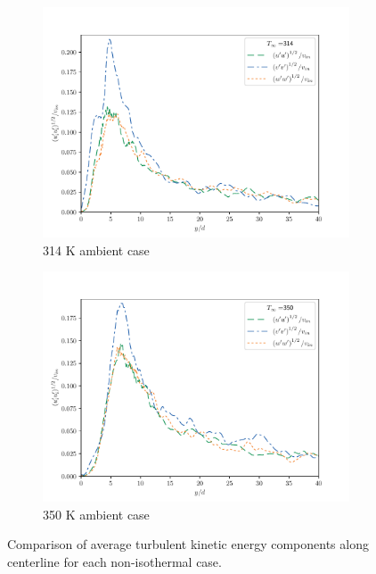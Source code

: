 \begin{figure}[ht!]
\begin{center}
\begin{subfigure}{0.45\textwidth}
	\includegraphics[scale=.45]{figures/Plots/centerline/314_TKEuvw_centerline.pdf}
	\caption{314 K ambient case} \label{314_TKEcomp_1}
\end{subfigure}
\begin{subfigure}{0.45\textwidth}
	\includegraphics[scale=.45]{figures/Plots/centerline/350_TKEuvw_centerline.pdf}
	\caption{350 K ambient case} \label{350_TKEcomp_1}
\end{subfigure}
\caption{Comparison of average turbulent kinetic energy components along centerline for each non-isothermal case.}
\label{noniso_TKE_component_features}
\end{center}
\end{figure}

